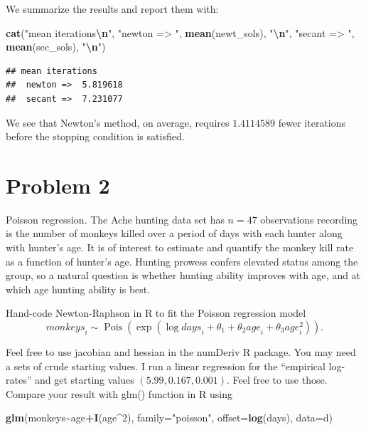 \documentclass[
]{article}
\newenvironment{Shaded}{\begin{snugshade}}{\end{snugshade}}
\newcommand{\AttributeTok}[1]{\textcolor[rgb]{0.13,0.29,0.53}{#1}}
\newcommand{\DecValTok}[1]{\textcolor[rgb]{0.00,0.00,0.81}{#1}}
\newcommand{\FunctionTok}[1]{\textcolor[rgb]{0.13,0.29,0.53}{\textbf{#1}}}
\newcommand{\NormalTok}[1]{#1}
\newcommand{\SpecialCharTok}[1]{\textcolor[rgb]{0.81,0.36,0.00}{\textbf{#1}}}
\newcommand{\StringTok}[1]{\textcolor[rgb]{0.31,0.60,0.02}{#1}}
\begin{document}
We summarize the results and report them with:

\begin{Shaded}
\begin{Highlighting}[]
\FunctionTok{cat}\NormalTok{(}\StringTok{"mean iterations}\SpecialCharTok{\textbackslash{}n}\StringTok{"}\NormalTok{,}
    \StringTok{"newton =\textgreater{} "}\NormalTok{, }\FunctionTok{mean}\NormalTok{(newt\_sols), }\StringTok{"}\SpecialCharTok{\textbackslash{}n}\StringTok{"}\NormalTok{,}
    \StringTok{"secant =\textgreater{} "}\NormalTok{, }\FunctionTok{mean}\NormalTok{(sec\_sols), }\StringTok{"}\SpecialCharTok{\textbackslash{}n}\StringTok{"}\NormalTok{)}
\end{Highlighting}
\end{Shaded}

\begin{verbatim}
## mean iterations
##  newton =>  5.819618 
##  secant =>  7.231077
\end{verbatim}

We see that Newton's method, on average, requires \(1.4114589\) fewer
iterations before the stopping condition is satisfied.

\hypertarget{problem-2}{%
\section{Problem 2}\label{problem-2}}

Poisson regression. The Ache hunting data set has \(n = 47\)
observations recording is the number of monkeys killed over a period of
days with each hunter along with hunter's age. It is of interest to
estimate and quantify the monkey kill rate as a function of hunter's
age. Hunting prowess confers elevated status among the group, so a
natural question is whether hunting ability improves with age, and at
which age hunting ability is best.

Hand-code Newton-Raphson in R to fit the Poisson regression model \[
  \mathit{monkeys}_i \sim \operatorname{Pois}\left(\exp(\log \mathit{days}_i  + \theta_1 + \theta_2 \mathit{age}_i + \theta_3 \mathit{age}_i^2)\right).
\]

Feel free to use jacobian and hessian in the numDeriv R package. You may
need a sets of crude starting values. I run a linear regression for the
``empirical log-rates'' and get starting values
\((5.99, 0.167, 0.001)\). Feel free to use those. Compare your result
with glm() function in R using

\begin{Shaded}
\begin{Highlighting}[]
\FunctionTok{glm}\NormalTok{(monkeys}\SpecialCharTok{\textasciitilde{}}\NormalTok{age}\SpecialCharTok{+}\FunctionTok{I}\NormalTok{(age}\SpecialCharTok{\^{}}\DecValTok{2}\NormalTok{), }\AttributeTok{family=}\StringTok{"poisson"}\NormalTok{, }\AttributeTok{offset=}\FunctionTok{log}\NormalTok{(days), }\AttributeTok{data=}\NormalTok{d)}
\end{Highlighting}
\end{Shaded}
\end{document}
